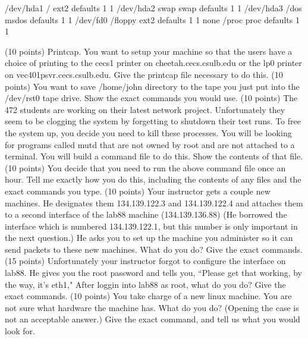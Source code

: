 {\program
/dev/hda1        /        ext2        defaults   1   1
/dev/hda2        swap     swap        defaults   1   1
/dev/hda3        /dos     msdos       defaults   1   1
/dev/fd0         /floppy  ext2        defaults   1   1
none             /proc    proc        defaults   1   1

\endprogram}
\vskip 2in
\ques
(10 points)
Printcap. You want to setup your machine so that the users have a choice
of printing to the cecs1 printer on cheetah.cecs.csulb.edu or the lp0
printer on vec401psvr.cecs.csulb.edu.
Give the printcap file necessary to do this.
\vfill\eject
\ques
(10 points)
You want to save {\ltt{}/home/john} directory to the tape you just put into
the {\ltt{}/dev/rst0} tape drive.
Show the exact commands you would use.
\vskip 2.0in
\ques
(10 points)
The 472 students are working on their latest network project.
Unfortunately they seem to be clogging the system by forgetting
to shutdown their test runs.
To free the system up, you decide you need to kill these processes.
You will be looking for programs called {\ltt{}mutd} that are
not owned by root and are not attached to a terminal.
You will build a command file to do this.
Show the contents of that file.
\vskip 2.5in
\ques
(10 points)
You decide that you need to run the above command file once an hour.
Tell me exactly how you do this, including the contents of any files
and the exact commands you type.
\vfill\eject
\ques
(10 points)
Your instructor gets a couple new machines.
He designates them {\ltt{}134.139.122.3} and {\ltt{}134.139.122.4} and
attaches them to a second interface of the lab88
machine ({\ltt{}134.139.136.88}) (He borrowed the interface which is numbered
{\ltt{}134.139.122.1}, but this number is only important in the next question.)
He asks you to set up the machine you administer so it can send packets to
these new machines.
What do you do?
Give the exact commands.
\vskip 2.5in
\ques
(15 points)
Unfortunately your instructor forgot to configure the interface on lab88.
He gives you the root password and tells you, ``Please get that working,
by the way, it's {\ltt{}eth1}," 
After loggin into lab88 as root, what do you do?
Give the exact commands.
\vskip 2in
\ques
(10 points)
You take charge of a new linux machine.
You are not sure what hardware the machine has.
What do you do? (Opening the case is not an acceptable answer.)
Give the exact command, and tell us what you would look for.
\bye
